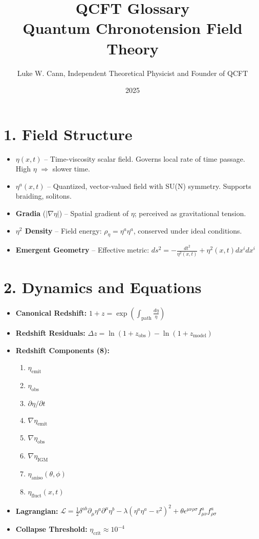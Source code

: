 \documentclass[12pt]{article}
\title{QCFT Glossary\\Quantum Chronotension Field Theory}
\author{Luke W. Cann, Independent Theoretical Physicist and Founder of QCFT}
\date{2025}
\begin{document}
\maketitle

\section*{1. Field Structure}

\begin{itemize}
\item \textbf{$\eta(x,t)$} – Time-viscosity scalar field. Governs local rate of time passage. High $\eta$ $\Rightarrow$ slower time.
\item \textbf{$\eta^a(x,t)$} – Quantized, vector-valued field with SU(N) symmetry. Supports braiding, solitons.
\item \textbf{Gradia} ($|\nabla \eta|$) – Spatial gradient of $\eta$; perceived as gravitational tension.
\item \textbf{$\eta^2$ Density} – Field energy: $\rho_{\eta} = \eta^a \eta^a$, conserved under ideal conditions.
\item \textbf{Emergent Geometry} – Effective metric: $ds^2 = -\frac{dt^2}{\eta^2(x,t)} + \eta^2(x,t) dx^i dx^i$
\end{itemize}

\section*{2. Dynamics and Equations}

\begin{itemize}
\item \textbf{Canonical Redshift:} $1 + z = \exp\left( \int_{\text{path}} \frac{d\eta}{\eta} \right)$
\item \textbf{Redshift Residuals:} $\Delta z = \ln(1 + z_{\text{obs}}) - \ln(1 + z_{\text{model}})$
\item \textbf{Redshift Components (8):}
  \begin{enumerate}
    \item $\eta_{\text{emit}}$
    \item $\eta_{\text{obs}}$
    \item $\partial \eta / \partial t$
    \item $\nabla \eta_{\text{emit}}$
    \item $\nabla \eta_{\text{obs}}$
    \item $\nabla \eta_{\text{IGM}}$
    \item $\eta_{\text{aniso}}(\theta, \phi)$
    \item $\eta_{\text{fluct}}(x,t)$
  \end{enumerate}
\item \textbf{Lagrangian:} $\mathcal{L} = \frac{1}{2} \delta^{ab} \partial_\mu \eta^a \partial^\mu \eta^b - \lambda (\eta^a \eta^a - v^2)^2 + \theta \epsilon^{\mu\nu\rho\sigma} f^a_{\mu\nu} f^a_{\rho\sigma}$
\item \textbf{Collapse Threshold:} $\eta_{\text{crit}} \approx 10^{-4}$
\end{itemize}
\end{document}
